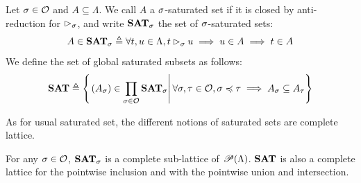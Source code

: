 \documentclass[a4paper,UKenglish,cleveref, autoref, thm-restate]{lipics-v2021}
\begin{document}
\begin{definition}
  Let $\sigma\in\mathcal O$ and $A \subseteq \Lambda$.
  We call $A$ a $\sigma$-saturated set if it is closed by anti-reduction for $\rhd_{\sigma}$, and write ${\mathbf{SAT}}_{\sigma}$ the set of $\sigma$-saturated sets:
  \[A \in {\mathbf{SAT}}_{\sigma} \triangleq \forall t,u \in \Lambda, t \rhd_{\sigma} u \implies u \in A \implies t \in A\]
  We define the set of global saturated subsets as follows:
  \[{\mathbf{SAT}} \triangleq \left\{\left.(A_{\sigma}) \in \prod_{\sigma\in\mathcal O} {\mathbf{SAT}}_{\sigma} \right\vert
  \forall \sigma,\tau\in\mathcal O, \sigma \preccurlyeq \tau \implies A_{\sigma} \subseteq A_{\tau}\right\}\]
\end{definition}

As for usual saturated set, the different notions of saturated sets are complete lattice.

\begin{proposition}
  For any $\sigma \in \mathcal O$, ${\mathbf{SAT}}_{\sigma}$ is a complete sub-lattice of $\mathscr{P}(\Lambda)$. ${\mathbf{SAT}}$ is also a complete lattice for the pointwise inclusion and with the pointwise union and intersection.
\end{proposition}


%



\end{document}
